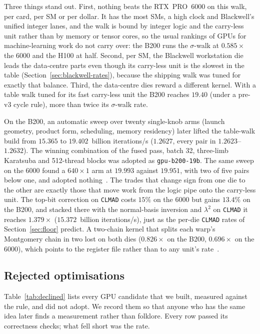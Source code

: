 

Three things stand out. First, nothing beats the RTX~PRO~6000 on this
walk, per card, per SM or per dollar. It has the most SMs, a high
clock and Blackwell's unified integer lanes, and the walk is bound by
integer logic and the carry-less unit rather than by memory or tensor
cores, so the usual rankings of GPUs for machine-learning work do not
carry over: the B200 runs the $\sigma$-walk at $0.585\times$ the 6000 and
the H100 at half. Second, per SM, the Blackwell workstation die leads
the data-centre parts even though its carry-less unit is the slowest
in the table (Section~\ref{sec:blackwell-rates}), because the shipping
walk was tuned for exactly that balance. Third, the data-centre dies
reward a different kernel. With a table walk tuned for its fast
carry-less unit the B200 reaches $19.40$ (under a pre-v3 cycle rule),
more than twice its
$\sigma$-walk rate.

On the B200, an automatic sweep over twenty single-knob arms (launch
geometry, product form, scheduling, memory residency) later lifted the
table-walk build from $15.365$ to $19.402$~billion iterations/s ($1.2627$, every pair in
$1.2623$--$1.2632$). The winning combination of the fused pass, batch
32, three-limb Karatsuba and 512-thread blocks was adopted as
\texttt{gpu-b200-19b}. The same sweep on the 6000 found a $640\times1$
arm at $19.993$ against $19.951$, with two of five pairs below one, and
adopted nothing~. The trades that change sign
from one die to the other are exactly those that move work from the
logic pipe onto the carry-less unit. The top-bit correction on
\texttt{CLMAD} costs $15\%$ on the 6000 but gains $13.4\%$ on the B200,
and stacked there with the normal-basis inversion and $\lambda^2$ on
\texttt{CLMAD} it reaches $1.379\times$ ($15.372$~billion iterations/s), just as the
per-die \texttt{CLMAD} rates of Section~\ref{sec:floor} predict. A
two-chain kernel that splits each warp's Montgomery chain in two lost
on both dies ($0.826\times$ on the B200, $0.696\times$ on the 6000),
which points to the register file rather than to any unit's
rate~.

\subsection{Rejected optimisations}
\label{sec:declined}

Table~\ref{tab:declined} lists every GPU candidate that we built,
measured against the rule, and did not adopt. We record them so that
anyone who has the same idea later finds a measurement rather than
folklore. Every row passed its correctness checks; what fell short was
the rate.

